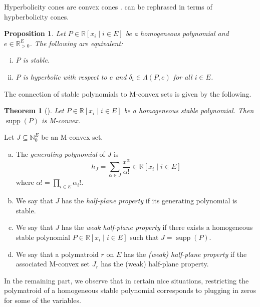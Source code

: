 \documentclass[11pt]{article}
\newtheorem{thm}[theo]{Theorem}
\newtheorem{prop}[theo]{Proposition}
\theoremstyle{definition}
\numberwithin{equation}{section}
\newcommand{\N}{{\mathbb N}}
\newcommand{\R}{{\mathbb R}}
\newcommand{\supp}{\operatorname{supp}}
\begin{document}
Hyperbolicity cones are convex cones \cite{gar}.  can be rephrased in terms of hypberbolicity cones.

\begin{prop}
   Let $P\in\R[x_i\mid i\in E]$ be a homogeneous polynomial and $e\in\R_{>0}^E$. The following are equivalent:
   \begin{enumerate}[(i)]
        \item $P$ is stable.
       \item $P$ is hyperbolic with respect to $e$ and $\delta_i\in\Lambda(P,e)$ for all $i\in E$.
   \end{enumerate}
\end{prop}

The connection of stable polynomials to M-convex sets is given by the following.

\begin{thm}[{\cite[Theorem~3.2]{BrandenHPP}}]
    Let $P\in\R[x_i\mid i\in E]$ be a homogeneous stable polynomial. Then $\supp(P)$ is M-convex.
\end{thm}

\begin{Def}
    Let $J\subseteq\N_0^E$ be an M-convex set.
    \begin{enumerate}[(a)]
        \item The \emph{generating polynomial} of $J$ is
        \begin{equation*}
            h_J=\sum_{\alpha\in J}\frac{x^\alpha}{\alpha!}\in \R[x_i\mid i\in E]
        \end{equation*}
        where $\alpha!=\prod_{i\in E}\alpha_i!$.
        \item We say that $J$ has the \emph{half-plane property} if its generating polynomial is stable.
        \item We say that $J$ has the \emph{weak half-plane property} if there exists a homogeneous stable polynomial $P\in\R[x_i\mid i\in E]$ such that $J=\supp(P)$.
        \item We say that a polymatroid $r$ on $E$ has the \emph{(weak) half-plane property} if the associated M-convex set $J_r$ has the (weak) half-plane property.
    \end{enumerate}
\end{Def}

In the remaining part, we observe that in certain nice situations, restricting the polymatroid of a homogeneous stable polynomial corresponds to plugging in zeros for some of the variables.
\end{document}
